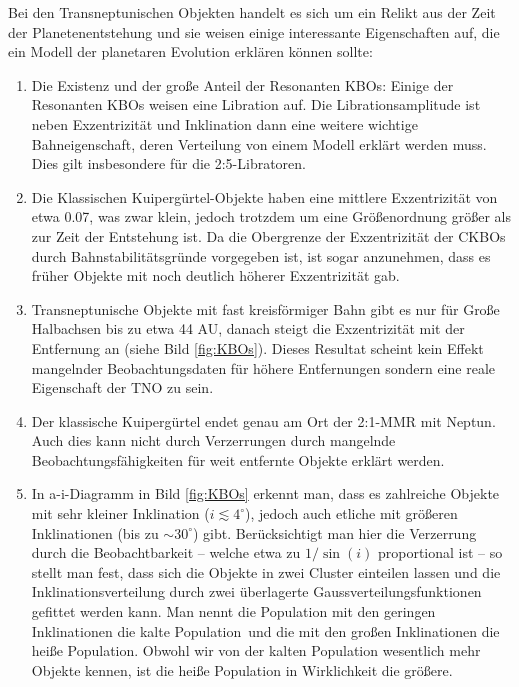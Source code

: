 \documentclass[12pt,a4paper,twoside]{article}
\begin{document}
\noindent
Bei den Transneptunischen Objekten handelt es sich um ein Relikt aus der Zeit der Planetenentstehung und sie weisen einige interessante Eigenschaften auf, die ein Modell der planetaren Evolution erklären können sollte: %
\begin{enumerate}
\item Die Existenz und der große Anteil der Resonanten KBOs: Einige der Resonanten KBOs weisen eine Libration auf. Die Librationsamplitude ist neben Exzentrizität und Inklination dann eine weitere wichtige Bahneigenschaft, deren Verteilung von einem Modell erklärt werden muss. Dies gilt insbesondere für die 2:5-Libratoren\cite{Levison2008}. %
\item Die Klassischen Kuipergürtel-Objekte haben eine mittlere Exzentrizität von etwa 0.07, was zwar klein, jedoch trotzdem um eine Größenordnung größer als zur Zeit der Entstehung ist. Da die Obergrenze der Exzentrizität der CKBOs durch Bahnstabilitätsgründe vorgegeben ist, ist sogar anzunehmen, dass es früher Objekte mit noch deutlich höherer Exzentrizität gab.
\item Transneptunische Objekte mit fast kreisförmiger Bahn gibt es nur für Große Halbachsen bis zu etwa 44 AU, danach steigt die Exzentrizität mit der Entfernung an (siehe Bild \ref{fig:KBOs})\cite{Levison2008}. Dieses Resultat scheint kein Effekt mangelnder Beobachtungsdaten für höhere Entfernungen sondern eine reale Eigenschaft der TNO zu sein\cite{Levison2008}.
\item Der klassische Kuipergürtel endet genau am Ort der 2:1-MMR mit Neptun\cite{Levison2008}. Auch dies kann nicht durch Verzerrungen durch mangelnde Beobachtungsfähigkeiten für weit entfernte Objekte erklärt werden.
\item In a-i-Diagramm in Bild \ref{fig:KBOs} erkennt man, dass es zahlreiche Objekte mit sehr kleiner Inklination ($i\lesssim 4^\circ$), jedoch auch etliche mit größeren Inklinationen (bis zu $\sim 30^\circ$) gibt. Berücksichtigt man hier die Verzerrung durch die Beobachtbarkeit -- welche etwa zu $1/\sin(i)$ proportional ist -- so stellt man fest, dass sich die Objekte in zwei Cluster einteilen lassen und die Inklinationsverteilung durch zwei überlagerte Gaussverteilungsfunktionen gefittet werden kann. %
Man nennt die Population mit den geringen Inklinationen die \glqq kalte Population\grqq\ und die mit den großen Inklinationen die \glqq heiße Population\grqq. Obwohl wir von der kalten Population wesentlich mehr Objekte kennen, ist die heiße Population in Wirklichkeit die größere\cite{Levison2008}.

\end{enumerate}
\end{document}
